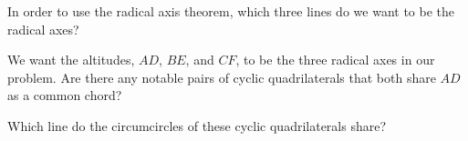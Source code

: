 In order to use the radical axis theorem, which three lines do we want to be the radical axes?















We want the altitudes, $AD$, $BE$, and $CF$, to be the three radical axes in our problem. Are there any notable pairs of cyclic quadrilaterals that both share $AD$ as a common chord?




Which line do the circumcircles of these cyclic quadrilaterals share?


